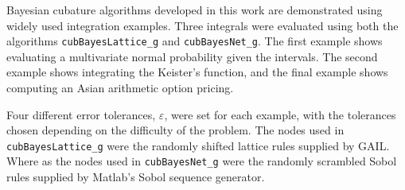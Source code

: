\documentclass{iitthesis}          %
\newcommand{\rlambda}{\mathring{\lambda}}
\newcommand{\MLE}{\textup{MLE}}
\newcommand{\GCV}{\textup{GCV}}
\newcommand{\err}{\textup{err}}
\newcommand{\code}[1]{\texttt{#1}}
\def\abs#1{\ensuremath{\left \lvert #1 \right \rvert}}
\begin{document}

Bayesian cubature algorithms developed in this work are demonstrated using widely used integration examples.
Three integrals were evaluated using both the algorithms \code{cubBayesLattice\_g} and \code{cubBayesNet\_g}. The first example shows evaluating a multivariate normal probability given the intervals. The second example shows integrating the Keister's function, and the final example shows computing an Asian arithmetic option pricing.  

\label{sec:numerical_experiments_cubBayesLattice}

Four different error tolerances, $\varepsilon$,  were set for each example, with the tolerances chosen depending on the difficulty of the problem.  The nodes used in \allowbreak \code{cubBayesLattice\_g} were the randomly shifted lattice rules supplied by GAIL.  
Where as the nodes used in \code{cubBayesNet\_g} were the randomly scrambled Sobol rules supplied by Matlab's Sobol sequence generator. 
\end{document}

